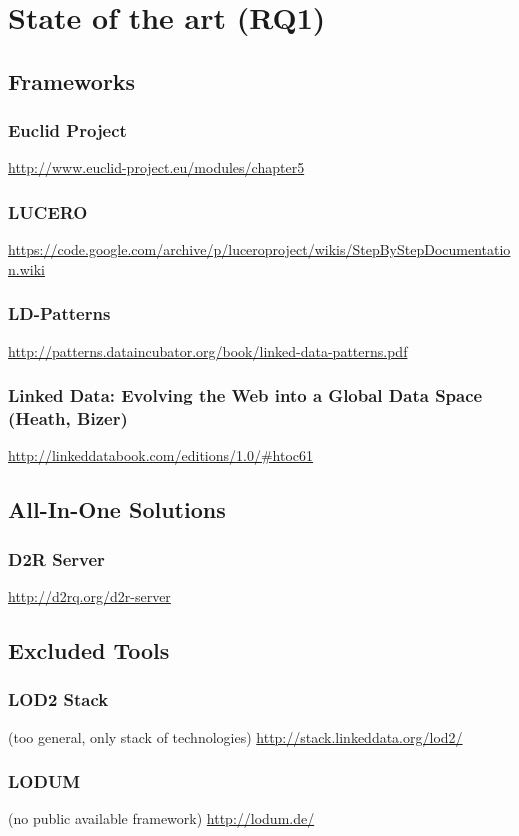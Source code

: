 \chapter{State of the art (RQ1)}
\section{Frameworks}
\subsection{Euclid Project}
\url{http://www.euclid-project.eu/modules/chapter5}
\subsection{LUCERO}
\url{https://code.google.com/archive/p/luceroproject/wikis/StepByStepDocumentation.wiki}
\subsection{LD-Patterns}
\url{http://patterns.dataincubator.org/book/linked-data-patterns.pdf }
\subsection{Linked Data: Evolving the Web into a Global Data Space (Heath, Bizer)}
\url{http://linkeddatabook.com/editions/1.0/#htoc61}
\section{All-In-One Solutions}
\subsection{D2R Server}
\url{http://d2rq.org/d2r-server}
\section{Excluded Tools}
\subsection{LOD2 Stack}
(too general, only stack of technologies)
\url{http://stack.linkeddata.org/lod2/}
\subsection{LODUM}
(no public available framework)
\url{http://lodum.de/}